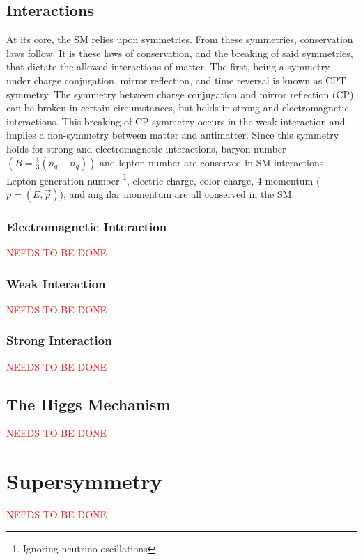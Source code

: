 	\subsection{Interactions}

		At its core, the SM relies upon symmetries. From these symmetries, conservation laws follow. It is these laws of conservation, and the breaking of said symmetries,  that dictate the allowed interactions of matter. The first, being a symmetry under charge conjugation, mirror reflection, and time reversal is known as CPT symmetry. The symmetry between charge conjugation and mirror reflection (CP) can be broken in certain circumstances, but holds in strong and electromagnetic interactions. This breaking of CP symmetry occurs in the weak interaction and implies a non-symmetry between matter and antimatter. Since this symmetry holds for strong and electromagnetic interactions, baryon number $(B = \frac{1}{3}(n_{q} - n_{\bar{q}}) )$ and lepton number are conserved in SM interactions. Lepton generation number \footnote{Ignoring neutrino oscillations}, electric charge, color charge, 4-momentum ($p=(E,\vec{p})$), and angular momentum are all conserved in the SM.


		\subsubsection{Electromagnetic Interaction}

			\textcolor{red}{NEEDS TO BE DONE}

		\subsubsection{Weak Interaction}
			\textcolor{red}{NEEDS TO BE DONE}

		\subsubsection{Strong Interaction}
			\textcolor{red}{NEEDS TO BE DONE}

	\subsection{The Higgs Mechanism}
		\textcolor{red}{NEEDS TO BE DONE}

\section{Supersymmetry}
	\textcolor{red}{NEEDS TO BE DONE}

